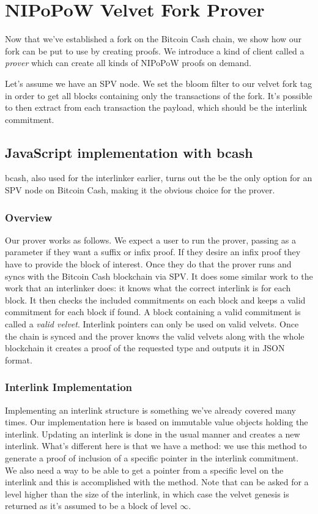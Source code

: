 \chapter{NIPoPoW Velvet Fork Prover}
\label{chap:prover}
Now that we've established a fork on the Bitcoin Cash chain, we show how our fork can be put to use by creating proofs. We introduce a kind of client called a \emph{prover} which can create all kinds of NIPoPoW proofs on demand.

Let's assume we have an SPV node. We set the bloom filter to our velvet fork tag in order to get all blocks containing only the transactions of the fork. It's possible to then extract from each transaction the payload, which should be the interlink commitment. 

\section{JavaScript implementation with bcash}
bcash, also used for the interlinker earlier, turns out the be the only option for an SPV node on Bitcoin Cash, making it the obvious choice for the prover.

\subsection{Overview}
Our prover works as follows. We expect a user to run the prover, passing as a parameter if they want a suffix or infix proof. If they desire an infix proof they have to provide the block of interest. Once they do that the prover runs and syncs with the Bitcoin Cash blockchain via SPV. It does some similar work to the work that an interlinker does: it knows what the correct interlink is for each block. It then checks the included commitments on each block and keeps a valid commitment for each block if found. A block containing a valid commitment is called a \emph{valid velvet}. Interlink pointers can only be used on valid velvets. Once the chain is synced and the prover knows the valid velvets along with the whole blockchain it creates a proof of the requested type and outputs it in JSON format.

\subsection{Interlink Implementation}
Implementing an interlink structure is something we've already covered many times. Our implementation here is based on immutable value objects holding the interlink. Updating an interlink is done in the usual manner and creates a new interlink. What's different here is that we have a  method: we use this method to generate a proof of inclusion of a specific pointer in the interlink commitment. We also need a way to be able to get a pointer from a specific level on the interlink and this is accomplished with the  method. Note that  can be asked for a level higher than the size of the interlink, in which case the velvet genesis is returned as it's assumed to be a block of level $\infty$.

